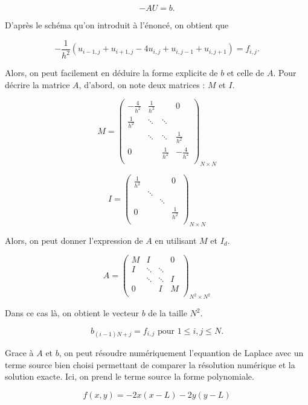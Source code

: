 \documentclass[titlepage,11pt,a4paper]{article}
\begin{document}
\begin{equation}
-AU = b.
\label{equ:equation_numerique_laplace}
\end{equation}

D'après le schéma qu'on introduit à l'énoncé, on obtient que

$$
-\frac 1 {h^2} (u_{i-1,j} + u_{i+1,j} - 4u_{i,j} + u_{i,j-1} + u_{i,j+1}) = f_{i,j}.
$$

Alors, on peut facilement en déduire la forme explicite de $b$ et celle de $A$.
Pour décrire la matrice $A$, d'abord, on note deux matrices : $M$ et $I$.

$$
  M =
  \begin{pmatrix}
   -\frac 4 {h^2} &  \frac 1 {h^2}&  &0\\
   \frac 1 {h^2}& \ddots & \ddots &\\
   &  \ddots& \ddots &\frac 1 {h^2}\\
   0&  &   \frac 1 {h^2}&   -\frac 4 {h^2}\\
  \end{pmatrix}_{N\times N}
$$

$$
  I =
  \begin{pmatrix}
   \frac 1 {h^2} &  &  &0\\
   & \ddots &  &\\
   &  & \ddots &\\
   0&  &   &   \frac 1 {h^2}\\
  \end{pmatrix}_{N\times N}
$$

Alors, on peut donner l'expression de $A$ en utilisant $M$ et $I_d$.

$$
  A =
  \begin{pmatrix}
   M &  I&  &0\\
   I& \ddots & \ddots &\\
   &  \ddots& \ddots &I\\
   0&  &   I&   M\\
  \end{pmatrix}_{N^2\times N^2}
$$

Dans ce cas là, on obtient le vecteur $b$ de la taille $N^2$.

$$
b_{(i-1)N + j} = f_{i,j} \mbox{ pour } 1 \leqslant i, j\leqslant N.
$$

Grace à $A$ et $b$, on peut résoudre numériquement l'equantion de Laplace avec un terme source bien choisi permettant de comparer la résolution numérique et la solution exacte. Ici, on prend le terme source la forme polynomiale.

$$
f(x, y) = -2x(x-L)-2y(y-L)
$$
\end{document}
